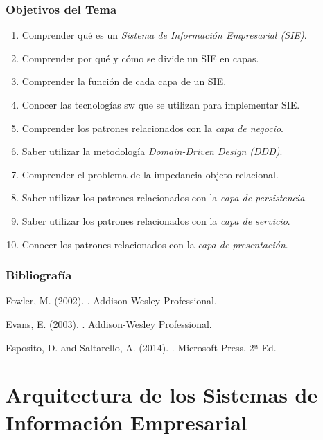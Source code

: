 \documentclass[a4paper,slidestop,xcolor=pst,dvips,blue]{beamer}
\begin{document}
\begin{frame}[c]
    \frametitle{Objetivos del Tema}
    \begin{enumerate}[<+->]
         \item Comprender qué es un \emph{Sistema de Información Empresarial (SIE)}.
         \item Comprender por qué y cómo se divide un SIE en capas.
         \item Comprender la función de cada capa de un SIE.
         \item Conocer las tecnologías sw que se utilizan para implementar SIE.
         \item Comprender los patrones relacionados con la \emph{capa de negocio}.
         \item Saber utilizar la metodología \emph{Domain-Driven Design (DDD)}.
         \item Comprender el problema de la impedancia objeto-relacional.
         \item Saber utilizar los patrones relacionados con la \emph{capa de persistencia}.
         \item Saber utilizar los patrones relacionados con la \emph{capa de servicio}.
         \item Conocer los patrones relacionados con la \emph{capa de presentación}.
    \end{enumerate}
\end{frame}

\begin{frame}[c]
    \frametitle{Bibliografía}
    \begin{thebibliography}{1}

        Fowler, M. (2002).
        .
        \newblock Addison-Wesley Professional.

        Evans, E. (2003).
        .
        \newblock Addison-Wesley Professional.

        Esposito, D. and Saltarello, A. (2014).
        .
        \newblock Microsoft Press. 2ª Ed.

    \end{thebibliography}
\end{frame}

\section{Arquitectura de los Sistemas de Información Empresarial}
\end{document}
